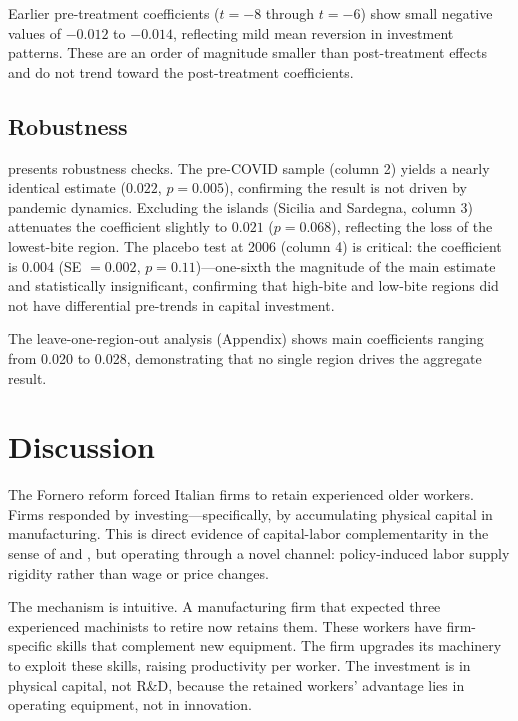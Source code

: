 \documentclass[12pt]{article}
\begin{document}
Earlier pre-treatment coefficients ($t = -8$ through $t = -6$) show small negative values of $-0.012$ to $-0.014$, reflecting mild mean reversion in investment patterns. These are an order of magnitude smaller than post-treatment effects and do not trend toward the post-treatment coefficients.

\subsection{Robustness}



 presents robustness checks. The pre-COVID sample (column 2) yields a nearly identical estimate ($0.022$, $p = 0.005$), confirming the result is not driven by pandemic dynamics. Excluding the islands (Sicilia and Sardegna, column 3) attenuates the coefficient slightly to $0.021$ ($p = 0.068$), reflecting the loss of the lowest-bite region. The placebo test at 2006 (column 4) is critical: the coefficient is 0.004 (SE $= 0.002$, $p = 0.11$)---one-sixth the magnitude of the main estimate and statistically insignificant, confirming that high-bite and low-bite regions did not have differential pre-trends in capital investment.

The leave-one-region-out analysis (Appendix) shows main coefficients ranging from 0.020 to 0.028, demonstrating that no single region drives the aggregate result.


\section{Discussion}

The Fornero reform forced Italian firms to retain experienced older workers. Firms responded by investing---specifically, by accumulating physical capital in manufacturing. This is direct evidence of capital-labor complementarity in the sense of \citet{griliches1969} and \citet{krusell2000}, but operating through a novel channel: policy-induced labor supply rigidity rather than wage or price changes.

The mechanism is intuitive. A manufacturing firm that expected three experienced machinists to retire now retains them. These workers have firm-specific skills that complement new equipment. The firm upgrades its machinery to exploit these skills, raising productivity per worker. The investment is in physical capital, not R\&D, because the retained workers' advantage lies in operating equipment, not in innovation.
\end{document}
